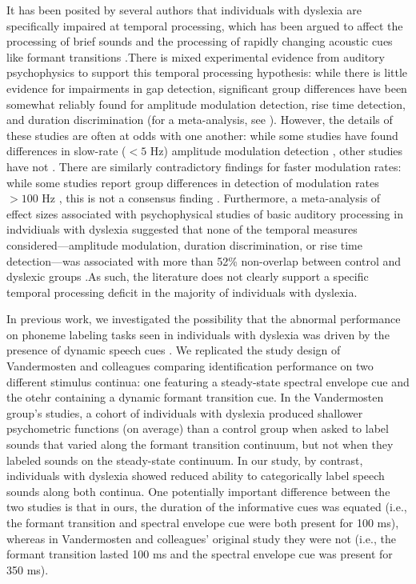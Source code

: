 \documentclass[../uwthesis.tex]{subfiles}
\begin{document}
It has been posited by several authors that individuals with dyslexia are specifically impaired at temporal processing, which has been argued to affect the processing of brief sounds \citep{Gaab2007,Lehongre2011,Richardson2004,Tallal1980} and the processing of rapidly changing acoustic cues like formant transitions \citep{Vandermosten2010,Vandermosten2011}.There is mixed experimental evidence from auditory psychophysics to support this temporal processing hypothesis: while there is little evidence for impairments in gap detection, significant group differences have been somewhat reliably found for amplitude modulation detection, rise time detection, and duration discrimination (for a meta-analysis, see \citep{Hamalainen2013}). However, the details of these studies are often at odds with one another: while some studies have found differences in slow-rate ($<5$ Hz) amplitude modulation detection \citep{Rocheron2002,Stuart2006}, other studies have not \citep{Amitay2002,Rocheron2002,Witton2002}. There are similarly contradictory findings for faster modulation rates: while some studies report group differences in detection of modulation rates $>100$ Hz \citep{Lorenzi2000, Menell1999, Rocheron2002}, this is not a consensus finding \citep{Amitay2002D,Stuart2006}. Furthermore, a meta-analysis of effect sizes associated with psychophysical studies of basic auditory processing in indvidiuals with dyslexia suggested that none of the temporal measures considered---amplitude modulation, duration discrimination, or rise time detection---was associated with more than 52\% non-overlap between control and dyslexic groups \citep{Hamalainen2013}.As such, the literature does not clearly support a specific temporal processing deficit in the majority of individuals with dyslexia.

In previous work, we investigated the possibility that the abnormal performance on phoneme labeling tasks seen in individuals with dyslexia was driven by the presence of dynamic speech cues \citep{OBrien2018}. We replicated the study design of Vandermosten and colleagues \citep{Vandermosten2010,Vandermosten2011} comparing identification performance on two different stimulus continua: one featuring a steady-state spectral envelope cue and the otehr containing a dynamic formant transition cue. In the Vandermosten group's studies, a cohort of individuals with dyslexia produced shallower psychometric functions (on average) than a control group when asked to label sounds that varied along the formant transition continuum, but not when they labeled sounds on the steady-state continuum. In our study, by contrast, individuals with dyslexia showed reduced ability to categorically label speech sounds along both continua. One potentially important difference between the two studies is that in ours, the duration of the informative cues was equated (i.e., the formant transition and spectral envelope cue were both present for 100 ms), whereas in Vandermosten and colleagues' original study they were not (i.e., the formant transition lasted 100 ms and the spectral envelope cue was present for 350 ms).
\end{document}
